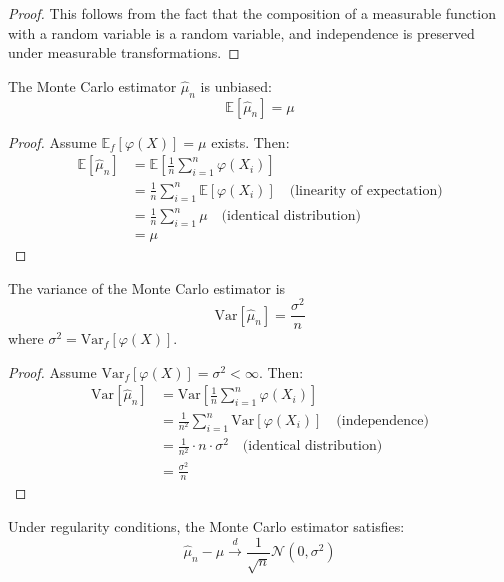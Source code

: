 \begin{proof}
This follows from the fact that the composition of a measurable function with a random variable is a random variable, and independence is preserved under measurable transformations.
\end{proof}

\begin{theoremrep}[Unbiasedness]
\label{theorem-unbiased}
The Monte Carlo estimator $\hat{\mu}_n$ is unbiased: 
\begin{equation}
    \mathbb{E}[\hat{\mu}_n] = \mu
\end{equation}
\end{theoremrep}

\begin{proof}
Assume $\mathbb{E}_f[\varphi(X)] = \mu$ exists. Then:
\begin{align*}
\mathbb{E}[\hat{\mu}_n] &= \mathbb{E}\left[\frac{1}{n}\sum_{i=1}^n\varphi(X_i)\right] \\
&= \frac{1}{n}\sum_{i=1}^n\mathbb{E}[\varphi(X_i)] \quad \text{(linearity of expectation)} \\
&= \frac{1}{n}\sum_{i=1}^n\mu \quad \text{(identical distribution)} \\
&= \mu
\end{align*}
\end{proof}

\begin{theoremrep}[Variance]
\label{theorem-variance}
The variance of the Monte Carlo estimator is 
\begin{equation}
    \text{Var}[\hat{\mu}_n] = \frac{\sigma^2}{n}
\end{equation}
where $\sigma^2 = \text{Var}_f[\varphi(X)]$.
\end{theoremrep}

\begin{proof}
Assume $\text{Var}_f[\varphi(X)] = \sigma^2 < \infty$. Then:
\begin{align*}
\text{Var}[\hat{\mu}_n] &= \text{Var}\left[\frac{1}{n}\sum_{i=1}^n\varphi(X_i)\right] \\
&= \frac{1}{n^2}\sum_{i=1}^n\text{Var}[\varphi(X_i)] \quad \text{(independence)} \\
&= \frac{1}{n^2} \cdot n \cdot \sigma^2 \quad \text{(identical distribution)} \\
&= \frac{\sigma^2}{n}
\end{align*}
\end{proof}

\begin{theorem}
\label{theorem-clt}
Under regularity conditions, the Monte Carlo estimator satisfies:
\begin{equation}
\hat{\mu}_n - \mu \xrightarrow{d} \frac{1}{\sqrt{n}}\mathcal{N}(0, \sigma^2)
\end{equation}
\end{theorem}


